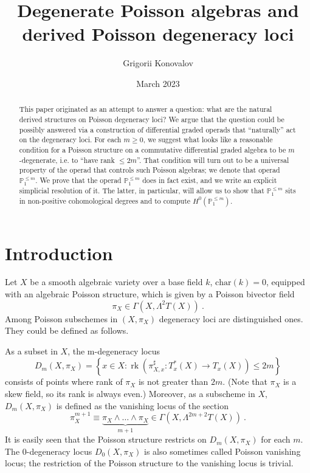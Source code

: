 \documentclass[10pt, oneside]{amsart}
\title{Degenerate Poisson algebras and derived Poisson degeneracy loci}
\author{Grigorii Konovalov}
\date{March 2023}
\theoremstyle{plain}
\newcommand{\La}{\Lambda}
\newcommand{\PP}{\mathbb{P}}
\DeclareMathOperator{\rk}{rk}
\begin{document}
\begin{abstract}
This paper originated as an attempt to answer a question: what are the natural derived structures on Poisson degeneracy loci?
We argue that the question could be possibly answered via a construction of differential graded operads that
``naturally'' act on the degeneracy 
loci. For each $m \ge 0$, we suggest what looks like a reasonable condition for a Poisson structure on a commutative differential
graded algebra to be $m$-degenerate, i.e. to ``have rank $\le 2m$''. That condition will turn out to be a universal property of
the operad that controls such Poisson algebras; we denote that operad $\PP_1^{\le m}$. We prove that the operad $\PP_1^{\le m}$ does in 
fact exist, and we write an explicit simplicial resolution of it. The latter, in particular, will allow us to show that
$\PP_1^{\le m}$ sits in non-positive cohomological degrees and to compute $H^0(\PP_1^{\le m})$.
\end{abstract}

\maketitle


\section{Introduction}

Let $X$ be a smooth algebraic variety over a base field $k$, $\mathrm{char}(k) = 0$,
equipped with an algebraic Poisson structure, which is given by a Poisson bivector field
\begin{equation*}
\pi_X \in \Gamma(X, \La^2 T(X)) \:.
\end{equation*}
Among Poisson subschemes in
$(X, \pi_X)$ degeneracy loci are distinguished ones. They could be defined as follows.
\begin{definition}\label{def1}
As a subset in $X$, the m-degeneracy locus
\begin{equation*}
D_{m}(X, \pi_X) = \left\{ x \in X : \rk (\pi^\sharp_{X, x} \colon T^*_x(X) \to T_x(X)) \le 2m \right\}
\end{equation*}
consists of points where rank of $\pi_X$ is not greater than $2m$. (Note that $\pi_X$ is a skew field, so its rank is always even.)
Moreover, as a subscheme in $X$, $D_{m}(X, \pi_X)$ is defined as the vanishing locus of the section
\begin{equation*}
\pi_X^{m+1} \equiv \underbrace{\pi_X \wedge \ldots \wedge \pi_X}_{m+1} \in \Gamma(X, \La^{2m+2}T(X)) \:.
\end{equation*}
It is easily seen that the Poisson structure restricts on $D_m(X, \pi_X)$ for each $m$. The $0$-degeneracy locus $D_0(X, \pi_X)$ is 
also sometimes called Poisson vanishing locus; the restriction of the Poisson structure to the vanishing locus is trivial.
\end{definition}
\end{document}
